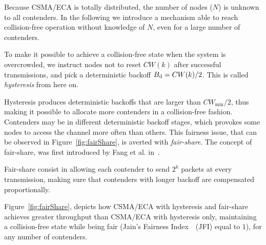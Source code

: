 Because CSMA/ECA is totally distributed, the number of nodes ($N$) is unknown to all contenders. In the following we introduce a mechanism able to reach collision-free operation without knowledge of $N$, even for a large number of contenders.



To make it possible to achieve a collision-free state when the system is overcrowded, we instruct nodes not to reset $CW(k)$ after successful transmissions, and pick a deterministic backoff $B_{\mbox{\scriptsize{d}}}=CW(k)/2$. This is called \emph{hysteresis} from here on. 






Hysteresis produces deterministic backoffs that are larger than $CW_{\min}/2$, thus making it possible to allocate more contenders in a collision-free fashion. Contenders may be in different deterministic backoff stages, which provokes some nodes to access the channel more often than others. This fairness issue, that can be observed in Figure~\ref{fig:fairShare}, is averted with \emph{fair-share}. The concept of fair-share, was first introduced by Fang et al. in~\cite{L_MAC2}.


Fair-share consist in allowing each contender to send $2^{k}$ packets at every transmission, making sure that contenders with longer backoff are compensated proportionally.

Figure~\ref{fig:fairShare}, depicts how CSMA/ECA with hysteresis and fair-share achieves greater throughput than CSMA/ECA with hysteresis only, maintaining a collision-free state while being fair (Jain's Fairness Index~\cite{JFI}~(JFI) equal to $1$), for any number of contenders.

